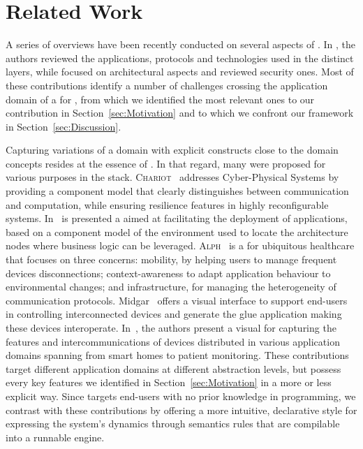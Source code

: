\section{Related Work}
\label{sec:RW}

A series of overviews have been recently conducted on several aspects of \IOT. In \cite{alfuqaha-15,xu-14a}, the authors reviewed the applications, protocols and technologies used in the distinct \IOT layers, while \cite{singh-14,gubbi-13} focused on architectural aspects and \cite{tan-10,xu-14b} reviewed security ones. Most of these contributions identify a number of challenges crossing the application domain of a \DSL for \IOT, from which we identified the most relevant ones to our contribution in Section~\ref{sec:Motivation} and to which we confront our framework in Section~\ref{sec:Discussion}.

Capturing variations of a domain with explicit constructs close to the domain concepts resides at the essence of \DSLS. In that regard, many \DSLS were proposed for various purposes in the \IOT stack. \textsc{Chariot}~\cite{pradhan-15} addresses Cyber-Physical Systems by providing a component model that clearly distinguishes between communication and computation, while ensuring resilience features in highly reconfigurable systems. In~\cite{brandtzaeg-12} is presented a \DSL aimed at facilitating the deployment of applications, based on a component model of the environment used to locate the architecture nodes where business logic can be leveraged. \textsc{Alph}~\cite{munnelly-08} is a \DSL for ubiquitous healthcare that focuses on three concerns: mobility, by helping users to manage frequent devices disconnections; context-awareness to adapt application behaviour to environmental changes; and infrastructure, for managing the heterogeneity of communication protocols. Midgar~\cite{garcia-14} offers a visual interface to support end-users in controlling interconnected devices and generate the glue application making these devices interoperate. In~\cite{salihbegovic-15}, the authors present a visual \DSL for capturing the features and intercommunications of devices distributed in various application domains spanning from smart homes to patient monitoring. These contributions target different application domains at different abstraction levels, but possess every key features we identified in Section~\ref{sec:Motivation} in a more or less explicit way. Since \IOTDSL targets end-users with no prior knowledge in programming, we contrast with these contributions by offering a more intuitive, declarative style for expressing the system's dynamics through semantics rules that are compilable into a runnable \CEP engine.

